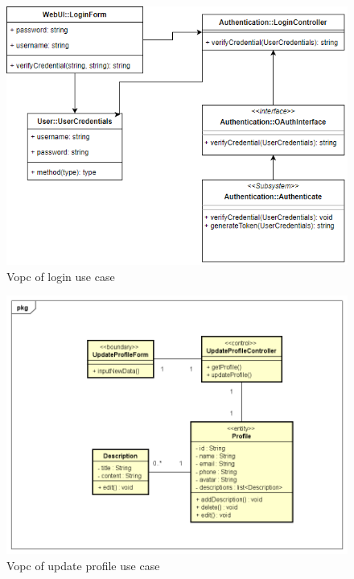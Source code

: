 \documentclass[a4paper]{article}
\begin{document}
\begin{figure}[H]
    \centering
    \includegraphics[width=1.0\textwidth]{vopc_login.png}
    \caption{Vopc of login use case}
    \label{fig:fig23}
\end{figure}

\begin{figure}[H]
    \centering
    \includegraphics[width=1.0\textwidth]{vopc_update_profile.png}
    \caption{Vopc of update profile use case}
    \label{fig:fig24}
\end{figure}
\end{document}
